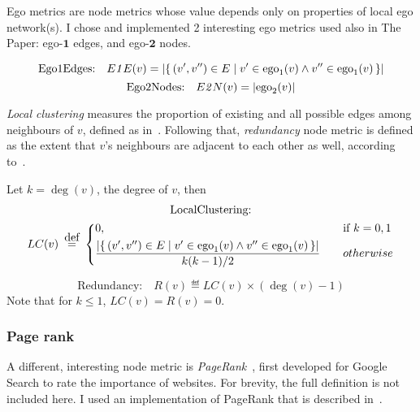 Ego metrics are node metrics whose value depends only on properties of local ego network(s).
I chose and implemented 2 interesting ego metrics used also in The Paper: ego-$\mathbf{1}$ edges, and ego-$\mathbf{2}$ nodes.

\begin{equation}
    \text{Ego1Edges:}\quad E\mathit{1}E (v) = \left\lvert \left\{\, (v', v'') \in E \mid  v' \in \operatorname{ego}_1(v) \wedge v'' \in \operatorname{ego}_1(v)  \, \right\} \right\rvert
\end{equation}
\begin{equation}
    \text{Ego2Nodes:}\quad E\mathit{2}N (v) = \left\lvert \operatorname{ego}_2(v) \right\rvert
\end{equation}

\textsl{Local clustering} measures the proportion of existing and all possible edges among neighbours of $v$, defined as in~\cite{WattsCollectiveDynamicsSmallworld1998}.
Following that, \textsl{redundancy} node metric is defined as the extent that $v$'s neighbours are adjacent to each other as well, according to~\cite{borgatti1997structural}.

Let $k = \deg(v)$, the degree of $v$, then
\begin{multline}
    \text{LocalClustering:}\nonumber \\
    LC(v) \eqdef
    \begin{dcases}
        0, &\text{if } k = 0,1 \\
        \frac{ \left\lvert \Set{ (v', v'') \in E }{ v' \in \ego_1(v) \wedge v'' \in \ego_1(v) } \right\rvert }{ k (k-1) / 2 } \quad &otherwise
    \end{dcases}
\end{multline}

\begin{equation}
    \text{Redundancy:}\quad R(v) \eqdef LC (v) \times (\deg(v) - 1)
\end{equation}
Note that for $k \leq 1$, $LC(v) = R(v) = 0$.

\subsubsection*{Page rank}

A different, interesting node metric is \textsl{PageRank}~\cite{BrinAnatomyLargescaleHypertextual1998}, first developed for Google Search to rate the importance of websites.
For brevity, the full definition is not included here.
I used an implementation of PageRank that is described in~\cite{ilprints422}.

